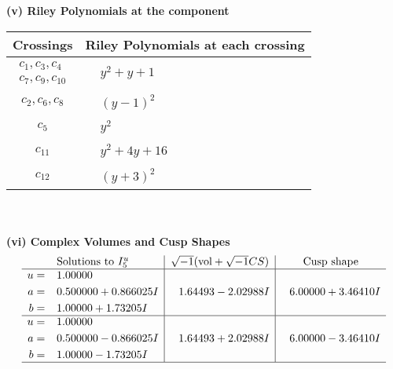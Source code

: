 \documentclass[1p]{elsarticle_modified}
\theoremstyle{definition}
\newcommand{\I}{\sqrt{-1}}
\begin{document}
\newpage\renewcommand{\arraystretch}{1}
\flushleft \textbf{(v) Riley Polynomials at the component}\newline \\
\begin{tabular}{m{50pt}|m{274pt}}
Crossings & \hspace{64pt}Riley Polynomials at each crossing \\
\hline $$\begin{aligned}c_{1},c_{3},c_{4}\\c_{7},c_{9},c_{10}\end{aligned}$$&$\begin{aligned}
&y^2+y+1
\end{aligned}$\\
\hline $$\begin{aligned}c_{2},c_{6},c_{8}\end{aligned}$$&$\begin{aligned}
&(y-1)^2
\end{aligned}$\\
\hline $$\begin{aligned}c_{5}\end{aligned}$$&$\begin{aligned}
&y^2
\end{aligned}$\\
\hline $$\begin{aligned}c_{11}\end{aligned}$$&$\begin{aligned}
&y^2+4 y+16
\end{aligned}$\\
\hline $$\begin{aligned}c_{12}\end{aligned}$$&$\begin{aligned}
&(y+3)^2
\end{aligned}$\\
\hline
\end{tabular}\\~\\
\newpage\flushleft \textbf{(vi) Complex Volumes and Cusp Shapes}
$$\begin{array}{c|c|c}  
\text{Solutions to }I^u_{5}& \I (\text{vol} + \sqrt{-1}CS) & \text{Cusp shape}\\
 \hline 
\begin{aligned}
u &= \phantom{-}1.00000\phantom{ +0.000000I} \\
a &= \phantom{-}0.500000 + 0.866025 I \\
b &= \phantom{-}1.00000 + 1.73205 I\end{aligned}
 & \phantom{-}1.64493 - 2.02988 I & \phantom{-}6.00000 + 3.46410 I \\ \hline\begin{aligned}
u &= \phantom{-}1.00000\phantom{ +0.000000I} \\
a &= \phantom{-}0.500000 - 0.866025 I \\
b &= \phantom{-}1.00000 - 1.73205 I\end{aligned}
 & \phantom{-}1.64493 + 2.02988 I & \phantom{-}6.00000 - 3.46410 I\\
 \hline 
 \end{array}$$\newpage\newpage\renewcommand{\arraystretch}{1}
\end{document}
